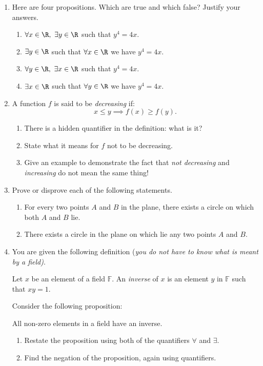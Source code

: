 \begin{enumerate}
	\item Here are four propositions. Which are true and which false? Justify your answers.\prelistskip
	\begin{enumerate}
	  \item $\forall x\in\R,\ \exists y\in\R$ such that $y^4=4x$.
	  \item $\exists y\in\R$ such that $\forall x\in\R$ we have $y^4=4x$.
	  \item $\forall y\in\R,\ \exists x\in\R$ such that $y^4=4x$.
	  \item $\exists x\in\R$ such that $\forall y\in\R$ we have $y^4=4x$.
	\end{enumerate}
	
	
	\item\label{ex:decreasing} A function $f$ is said to be \emph{decreasing} if:
	\[x\le y\implies f(x)\ge f(y).\]
	\begin{enumerate}
	  \item There is a hidden quantifier in the definition: what is it?
	  \item State what it means for $f$ not to be decreasing.
	  \item Give an example to demonstrate the fact that \emph{not decreasing} and \emph{increasing} do not mean the same thing!
	\end{enumerate}
	
	\item Prove or disprove each of the following statements.\prelistskip
	\begin{enumerate}
	  \item For every two points $A$ and $B$ in the plane, there exists a circle on which both $A$ and $B$ lie.
	  \item There exists a circle in the plane on which lie any two points $A$ and $B$.
	\end{enumerate}
  
	\item You are given the following definition (\emph{you do not have to know what is meant by a field)}.
	\begin{center}
	Let $x$ be an element of a field $\mathbb{F}$. An \emph{inverse} of $x$ is an element $y$ in $\mathbb{F}$ such that $xy=1$.
	\end{center}
	Consider the following proposition:
	\begin{center}
	All non-zero elements in a field have an inverse.
	\end{center}
	\begin{enumerate}
	  \item Restate the proposition using both of the quantifiers $\forall$ and $\exists$.
	  \item Find the negation of the proposition, again using quantifiers.
	\end{enumerate}\goodbreak
	

\end{enumerate}
